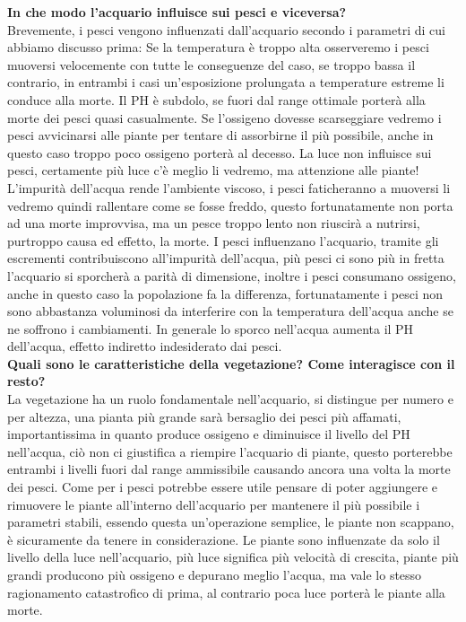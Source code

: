 \documentclass[12pt,a4paper,oneside,article]{article}
\begin{document}
	{\large \textbf{In che modo l'acquario influisce sui pesci e viceversa?}}\\
	Brevemente, i pesci vengono influenzati dall'acquario secondo i parametri di cui abbiamo discusso prima: Se la temperatura è troppo alta osserveremo i pesci muoversi velocemente con tutte le conseguenze del caso, se troppo bassa il contrario, in entrambi i casi un'esposizione prolungata a temperature estreme li conduce alla morte. Il PH è subdolo, se fuori dal range ottimale porterà alla morte dei pesci quasi casualmente. Se l'ossigeno dovesse scarseggiare vedremo i pesci avvicinarsi alle piante per tentare di assorbirne il più possibile, anche in questo caso troppo poco ossigeno porterà al decesso. La luce non influisce sui pesci, certamente più luce c'è meglio li vedremo, ma attenzione alle piante! L'impurità dell'acqua rende l'ambiente viscoso, i pesci faticheranno a muoversi li vedremo quindi rallentare come se fosse freddo, questo fortunatamente non porta ad una morte improvvisa, ma un pesce troppo lento non riuscirà a nutrirsi, purtroppo causa ed effetto, la morte. I pesci influenzano l'acquario, tramite gli escrementi contribuiscono all'impurità dell'acqua, più pesci ci sono più in fretta l'acquario si sporcherà a parità di dimensione, inoltre i pesci consumano ossigeno, anche in questo caso la popolazione fa la differenza, fortunatamente i pesci non sono abbastanza voluminosi da interferire con la temperatura dell'acqua anche se ne soffrono i cambiamenti. In generale lo sporco nell'acqua aumenta il PH dell'acqua, effetto indiretto indesiderato dai pesci.
	\\
	
	{\large \textbf{Quali sono le caratteristiche della vegetazione? Come interagisce con il resto?}}\\
	La vegetazione ha un ruolo fondamentale nell'acquario, si distingue per numero e per altezza, una pianta più grande sarà bersaglio dei pesci più affamati, importantissima in quanto produce ossigeno e diminuisce il livello del PH nell'acqua, ciò non ci giustifica a riempire l'acquario di piante, questo porterebbe entrambi i livelli fuori dal range ammissibile causando ancora una volta la morte dei pesci. Come per i pesci potrebbe essere utile pensare di poter aggiungere e rimuovere le piante all'interno dell'acquario per mantenere il più possibile i parametri stabili, essendo questa un'operazione semplice, le piante non scappano, è sicuramente da tenere in considerazione. Le piante sono influenzate da solo il livello della luce nell'acquario, più luce significa più velocità di crescita, piante più grandi producono più ossigeno e depurano meglio l'acqua, ma vale lo stesso ragionamento catastrofico di prima, al contrario poca luce porterà le piante alla morte.
	\\
	
\end{document}
